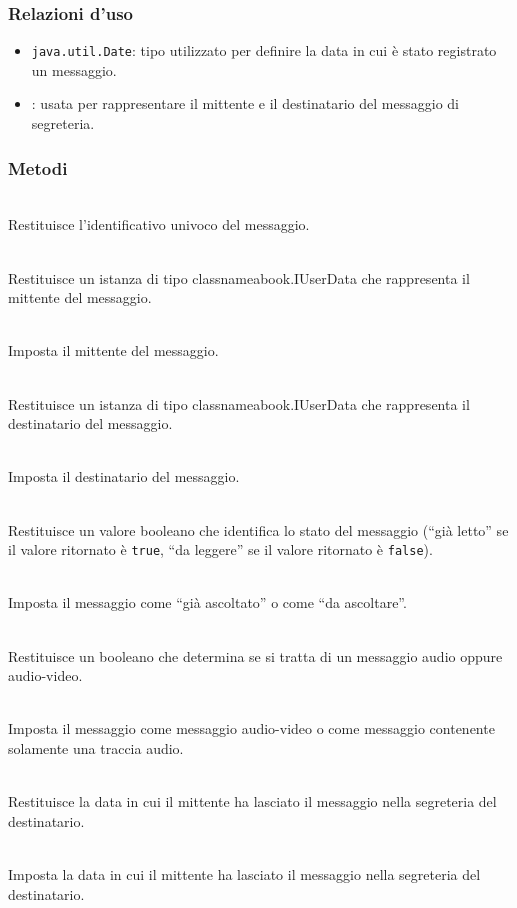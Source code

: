 \subsubsection*{Relazioni d'uso}
\begin{itemize}
	\item \texttt{java.util.Date}: tipo utilizzato per definire la data in cui è stato registrato un messaggio.
	\item {}: usata per rappresentare il mittente e il destinatario del messaggio di segreteria.
\end{itemize}

\subsubsection*{Metodi}
\begin{description}
	\item{}\\
	Restituisce l'identificativo univoco del messaggio.
	\item{}\\
	Restituisce un istanza di tipo classname{abook.IUserData} che rappresenta il mittente del messaggio.
	\item{}\\
	Imposta il mittente del messaggio.
	\item{}\\
	Restituisce un istanza di tipo classname{abook.IUserData} che rappresenta il destinatario del messaggio.
	\item{}\\
	Imposta il destinatario del messaggio.
	\item{}\\
	Restituisce un valore booleano che identifica lo stato del messaggio (``già letto'' se il valore ritornato è \texttt{true}, ``da leggere'' se il valore ritornato è \texttt{false}).
	\item{}\\
	Imposta il messaggio come ``già ascoltato'' o come ``da ascoltare''.
	\item{}\\
	Restituisce un booleano che determina se si tratta di un messaggio audio oppure audio-video.
	\item{}\\	
	Imposta il messaggio come messaggio audio-video o come messaggio contenente solamente una traccia audio.
	\item{}\\
	Restituisce la data in cui il mittente ha lasciato il messaggio nella segreteria del destinatario.
	\item{}\\
	Imposta la data in cui il mittente ha lasciato il messaggio nella segreteria del destinatario.
\end{description}

